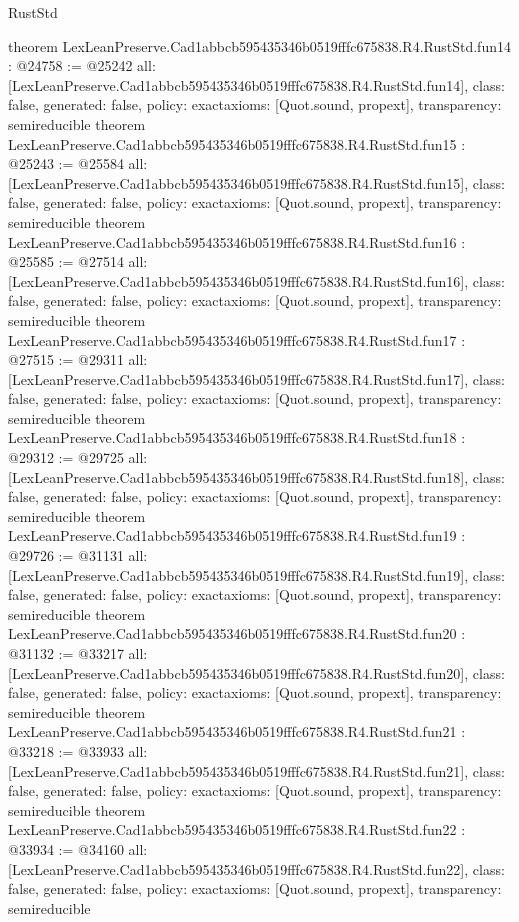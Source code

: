 \begin{lexlean}{RustStd}
\begin{coremodule}
{}
theorem LexLeanPreserve.Cad1abbcb595435346b0519fffc675838.R4.RustStd.fun14 : @24758 := @25242 {
  all: [LexLeanPreserve.Cad1abbcb595435346b0519fffc675838.R4.RustStd.fun14],
  class: false,
  generated: false,
  policy: exact{axioms: [Quot.sound, propext]},
  transparency: semireducible
}
theorem LexLeanPreserve.Cad1abbcb595435346b0519fffc675838.R4.RustStd.fun15 : @25243 := @25584 {
  all: [LexLeanPreserve.Cad1abbcb595435346b0519fffc675838.R4.RustStd.fun15],
  class: false,
  generated: false,
  policy: exact{axioms: [Quot.sound, propext]},
  transparency: semireducible
}
theorem LexLeanPreserve.Cad1abbcb595435346b0519fffc675838.R4.RustStd.fun16 : @25585 := @27514 {
  all: [LexLeanPreserve.Cad1abbcb595435346b0519fffc675838.R4.RustStd.fun16],
  class: false,
  generated: false,
  policy: exact{axioms: [Quot.sound, propext]},
  transparency: semireducible
}
theorem LexLeanPreserve.Cad1abbcb595435346b0519fffc675838.R4.RustStd.fun17 : @27515 := @29311 {
  all: [LexLeanPreserve.Cad1abbcb595435346b0519fffc675838.R4.RustStd.fun17],
  class: false,
  generated: false,
  policy: exact{axioms: [Quot.sound, propext]},
  transparency: semireducible
}
theorem LexLeanPreserve.Cad1abbcb595435346b0519fffc675838.R4.RustStd.fun18 : @29312 := @29725 {
  all: [LexLeanPreserve.Cad1abbcb595435346b0519fffc675838.R4.RustStd.fun18],
  class: false,
  generated: false,
  policy: exact{axioms: [Quot.sound, propext]},
  transparency: semireducible
}
theorem LexLeanPreserve.Cad1abbcb595435346b0519fffc675838.R4.RustStd.fun19 : @29726 := @31131 {
  all: [LexLeanPreserve.Cad1abbcb595435346b0519fffc675838.R4.RustStd.fun19],
  class: false,
  generated: false,
  policy: exact{axioms: [Quot.sound, propext]},
  transparency: semireducible
}
theorem LexLeanPreserve.Cad1abbcb595435346b0519fffc675838.R4.RustStd.fun20 : @31132 := @33217 {
  all: [LexLeanPreserve.Cad1abbcb595435346b0519fffc675838.R4.RustStd.fun20],
  class: false,
  generated: false,
  policy: exact{axioms: [Quot.sound, propext]},
  transparency: semireducible
}
theorem LexLeanPreserve.Cad1abbcb595435346b0519fffc675838.R4.RustStd.fun21 : @33218 := @33933 {
  all: [LexLeanPreserve.Cad1abbcb595435346b0519fffc675838.R4.RustStd.fun21],
  class: false,
  generated: false,
  policy: exact{axioms: [Quot.sound, propext]},
  transparency: semireducible
}
theorem LexLeanPreserve.Cad1abbcb595435346b0519fffc675838.R4.RustStd.fun22 : @33934 := @34160 {
  all: [LexLeanPreserve.Cad1abbcb595435346b0519fffc675838.R4.RustStd.fun22],
  class: false,
  generated: false,
  policy: exact{axioms: [Quot.sound, propext]},
  transparency: semireducible
}
\end{coremodule}
\end{lexlean}

